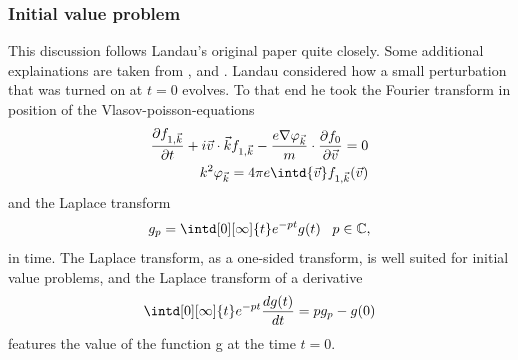 \documentclass[physics,phd,nolot,nolof]{uccthesis}%
\begin{document}
\subsubsection{Initial value problem}
This discussion follows Landau's original paper\cite{Landaudamping1946} quite closely. Some additional explainations are taken from \cite{caltechbook},\cite{boydsanderson} and \cite{bittencourtplasmafundamentals}.
Landau considered how a small perturbation that was turned on at $t=0$ evolves. 
To that end he took the Fourier transform in position of the  Vlasov-poisson-equations 
\begin{eqnarray}
	\frac{\partial f_{1,\vec k}}{\partial t} +
	i\vec{v}\cdot\vec{k} f_{1,\vec k} 
	-\frac{e \nabla \varphi_{\vec k}}{m} \cdot \frac{\partial f_0}{\partial \vec v} =0\\
	k^2\varphi_{\vec k}=4\pi e\intd{\vec v}f_{1,\vec k}(\vec v)
	\label{eq:fouriervlasov}
\end{eqnarray}
and the Laplace transform 
\begin{equation}
  g_p=\intd[0][\infty]{t} e^{-pt}g(t) \;\;\; p\in \mathbb{C}, 
	\label{eq:laplace}
\end{equation}
in time. 
The Laplace transform, as a one-sided transform, is well suited for initial value problems, and the Laplace transform of a derivative  
\begin{equation}
  \intd[0][\infty]{t} e^{-pt}\frac{d g(t)}{d t}=p g_p -g(0)
	\label{eq:laplacediff}
\end{equation}
features the value of the function g at the time $t=0$.
\end{document}
